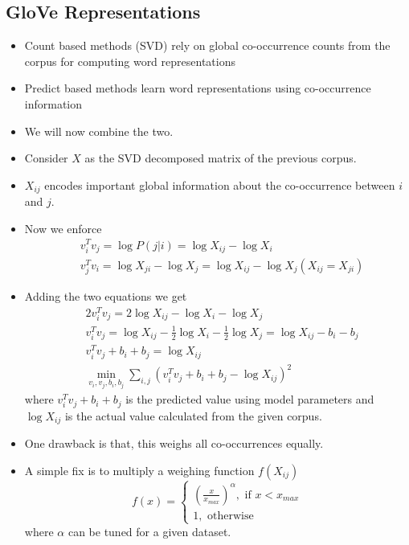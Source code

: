 \documentclass[a4paper]{article}
\begin{document}
\subsection{GloVe Representations}
\begin{itemize}
    \item Count based methods (SVD) rely on global co-occurrence counts from the corpus for computing word representations
    \item Predict based methods learn word representations using co-occurrence information
    \item We will now combine the two.
    \item Consider $X$ as the SVD decomposed matrix of the previous corpus.
    \item $X_{ij}$ encodes important global information about the co-occurrence between $i$ and $j$.
    \item Now we enforce
    \begin{equation*}
        \begin{split}
            &v_i^Tv_j=\log P(j|i)=\log X_{ij}-\log X_i\\
            &v_j^Tv_i=\log X_{ji}-\log X_j=\log X_{ij}-\log X_j(X_{ij}=X_{ji})
        \end{split}
    \end{equation*}
    \item Adding the two equations we get
    \begin{equation*}
        \begin{split}
            &2v_i^Tv_j=2\log X_{ij}-\log X_i-\log X_j\\
            &v_i^Tv_j=\log X_{ij}-\frac{1}{2}\log X_i-\frac{1}{2}\log X_j=\log X_{ij}-b_i-b_j\\
            &v_i^Tv_j+b_i+b_j=\log X_{ij}\\
            &\min_{v_i,v_j,b_i,b_j}\sum_{i,j}(v_i^Tv_j+b_i+b_j-\log X_{ij})^2 
        \end{split}
    \end{equation*}
    where $v_i^Tv_j+b_i+b_j$ is the predicted value using model parameters and $\log X_{ij}$ is the actual value calculated from the given corpus.
    \item One drawback is that, this weighs all co-occurrences equally.
    \item A simple fix is to multiply a weighing function $f(X_{ij})$
    \begin{equation*}
        f(x)=\begin{cases}
            (\frac{x}{x_{max}})^\alpha,\text{ if }x<x_{max}\\
            1,\text{ otherwise}
        \end{cases}
    \end{equation*}
    where $\alpha$ can be tuned for a given dataset.
\end{itemize}
\end{document}
